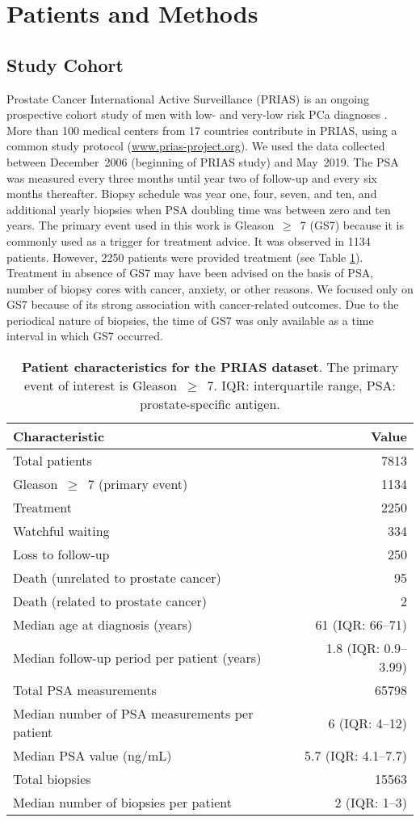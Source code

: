 \section{Patients and Methods}

\subsection{Study Cohort}
Prostate Cancer International Active Surveillance (PRIAS) is an ongoing prospective cohort study of men with low- and very-low risk PCa diagnoses \cite{bul2013active}. More than 100 medical centers from 17 countries contribute in PRIAS, using a common study protocol (\url{www.prias-project.org}). We used the data collected between December~2006 (beginning of PRIAS study) and May~2019. The PSA was measured every three months until year two of follow-up and every six months thereafter. Biopsy schedule was year one, four, seven, and ten, and additional yearly biopsies when PSA doubling time was between zero and ten years. The primary event used in this work is Gleason~$\geq$~7 (GS7) because it is commonly used as a trigger for treatment advice. It was observed in 1134 patients. However, 2250 patients were provided treatment (see Table \ref{table:prias_summary}). Treatment in absence of GS7 may have been advised on the basis of PSA, number of biopsy cores with cancer, anxiety, or other reasons. We focused only on GS7 because of its strong association with cancer-related outcomes. Due to the periodical nature of biopsies, the time of GS7 was only available as a time interval in which GS7 occurred.

\begin{table}
\small\sf\centering
\caption{\textbf{Patient characteristics for the PRIAS dataset}. The primary event of interest is Gleason~$\geq$~7. IQR: interquartile range, PSA: prostate-specific antigen.}
\label{table:prias_summary}
\begin{tabular}{lr}
\hline
\hline
Characteristic & Value\\
\hline
Total patients & 7813\\
Gleason~$\geq$~7 (primary event) & 1134\\
Treatment & 2250\\
Watchful waiting & 334\\
Loss to follow-up & 250\\
Death (unrelated to prostate cancer) & 95\\
Death (related to prostate cancer) & 2\\
\hline
Median age at diagnosis (years) & 61 (IQR: 66--71)\\
Median follow-up period per patient (years) &  1.8 (IQR: 0.9--3.99)\\
Total PSA measurements & 65798\\
Median number of PSA measurements per patient &  6 (IQR: 4--12)\\
Median PSA value (ng/mL) & 5.7 (IQR: 4.1--7.7)\\
Total biopsies & 15563\\
Median number of biopsies per patient &  2 (IQR: 1--3)\\
\hline
\end{tabular}
\end{table}